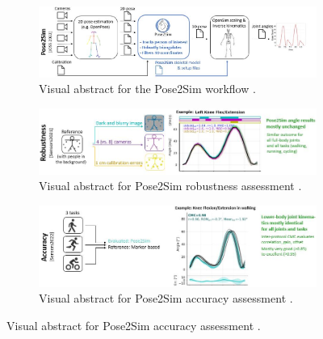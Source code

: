 \begin{figure}[hbtp]
	\centering
	\begin{subfigure}[b]{1\textwidth}
            \centering
            \def\svgwidth{1\columnwidth}
            \fontsize{10pt}{10pt}\selectfont
            \includegraphics[width=\linewidth]{"../Intro/Figures/Fig_VisAbstract1.JPG"}
            \caption{Visual abstract for the Pose2Sim workflow \cite{Pagnon2022b}.}
            \label{fig_visabstract1_11}
	\end{subfigure}
	\vskip 1cm
	\begin{subfigure}[b]{1\textwidth}
            \centering
            \def\svgwidth{1\columnwidth}
            \fontsize{10pt}{10pt}\selectfont
            \includegraphics[width=\linewidth]{"../Intro/Figures/Fig_VisAbstract2.JPG"}
            \caption{Visual abstract for Pose2Sim robustness assessment \cite{Pagnon2021}.}
            \label{fig_visabstract2_1}
	\end{subfigure}
	\vskip 1cm
      \begin{subfigure}[b]{1\textwidth}
            \centering
            \def\svgwidth{1\columnwidth}
            \fontsize{10pt}{10pt}\selectfont
            \includegraphics[width=\linewidth]{"../Intro/Figures/Fig_VisAbstract3.JPG"}
            \caption{Visual abstract for Pose2Sim accuracy assessment \cite{Pagnon2022a}.}
            \label{fig_visabstract3_1}
	\end{subfigure}

\end{figure}
